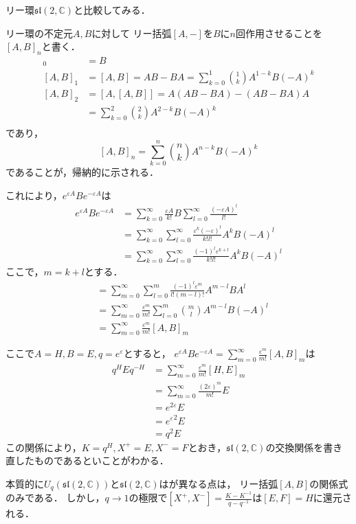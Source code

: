 \documentclass[dvipdfm]{beamer}
\newcommand{\CC}{\mathbb{C}}
\begin{document}
  \begin{frame}
    リー環$\mathfrak{sl}(2,\CC)$と比較してみる．

    リー環の不定元$A,B$に対して
    リー括弧$[A,-]$を$B$に$n$回作用させることを$[A,B]_n$と書く．
    \begin{align*}
      [A,B]_0 &= B\\
      [A,B]_1 &= [A,B] = AB-BA = \sum_{k=0}^{1} \binom{1}{k}A^{1-k}B(-A)^k\\
      [A,B]_2 &= [A,[A,B]] = A(AB-BA)-(AB-BA)A \\
      &= \sum_{k=0}^{2} \binom{2}{k}A^{2-k}B(-A)^k\\
    \end{align*}
    であり，
    \[
    [A,B]_n = \sum_{k=0}^{n} \binom{n}{k}A^{n-k}B(-A)^k
    \]
    であることが，帰納的に示される．
  \end{frame}
  \begin{frame}
    これにより，$e^{\varepsilon A}Be^{-\varepsilon A}$は
    \begin{align*}
      e^{\varepsilon A}Be^{-\varepsilon A} &= \sum_{k=0}^{\infty}\frac{\varepsilon A}{k!} B \sum_{l=0}^{\infty}\frac{(-\varepsilon A)^l}{l!} \\
      &= \sum_{k=0}^{\infty}\sum_{l=0}^{\infty}\frac{\varepsilon^k(-\varepsilon)^l}{k!l!}A^kB(-A)^l\\
      &= \sum_{k=0}^{\infty}\sum_{l=0}^{\infty}\frac{(-1)^l\varepsilon^{k+l}}{k!l!}A^kB(-A)^l
    \end{align*}
    ここで，$m=k+l$とする．
    \begin{align*}
      &= \sum_{m=0}^{\infty}\sum_{l=0}^{m}\frac{(-1)^l\varepsilon^{m}}{l!(m-l)!}A^{m-l}BA^l \\
      &= \sum_{m=0}^{\infty}\frac{\varepsilon^{m}}{m!}\sum_{l=0}^{m}\binom{m}{l}A^{m-l}B(-A)^l \\
      &= \sum_{m=0}^{\infty}\frac{\varepsilon^{m}}{m!}[A,B]_m
    \end{align*}
  \end{frame}
  \begin{frame}
    ここで$A=H,B=E,q=e^{\varepsilon}$とすると，
    $e^{\varepsilon A}Be^{-\varepsilon A}=\sum_{m=0}^{\infty}\frac{\varepsilon^{m}}{m!}[A,B]_m$は
    \begin{align*}
      q^H E q^{-H} &= \sum_{m=0}^{\infty}\frac{\varepsilon^{m}}{m!}[H,E]_m\\
      &= \sum_{m=0}^{\infty}\frac{(2\varepsilon)^{m}}{m!}E\\
      &= e^{2\varepsilon}E\\
      &= {e^{\varepsilon}}^2 E\\
      &= q^2 E
    \end{align*}
    この関係により，$K = q^H,X^+=E,X^-=F$とおき，$\mathfrak{sl}(2,\CC)$の交換関係を書き直したものであるといことがわかる．

    本質的に$U_q(\mathfrak{sl}(2,\CC))$と$\mathfrak{sl}(2,\CC)$はが異なる点は，
    リー括弧$[A,B]$の関係式のみである．
    しかし，$q\to1$の極限で$[X^+,X^-]=\frac{K-K^{-1}}{q-q^{-1}}$は$[E,F]=H$に還元される．
  \end{frame}
\end{document}
